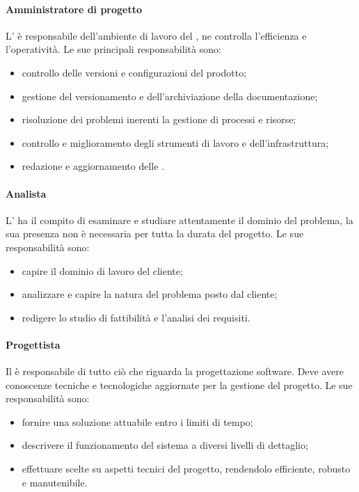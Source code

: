 			\paragraph{Amministratore di progetto}
			L'\amministratore{} è responsabile dell'ambiente di lavoro del , ne controlla l'efficienza e l'operatività.
			Le sue principali responsabilità sono:
			\begin{itemize}
				\item controllo delle versioni e configurazioni del prodotto;
				\item gestione del versionamento e dell'archiviazione della documentazione;
				\item risoluzione dei problemi inerenti la gestione di processi e risorse;
				\item controllo e miglioramento degli strumenti di lavoro e dell'infrastruttura;
				\item redazione e aggiornamento delle \ndp{}.
			\end{itemize}
			\paragraph{Analista}
			L'\analista{} ha il compito di esaminare e studiare attentamente il dominio del problema, la sua presenza non è necessaria per tutta la durata del progetto.
			Le sue responsabilità sono:
			\begin{itemize}
				\item capire il dominio di lavoro del cliente;
				\item analizzare e capire la natura del problema posto dal cliente;
				\item redigere lo studio di fattibilità e l'analisi dei requisiti.
			\end{itemize}
			\paragraph{Progettista}
			Il \progettista{} è responsabile di tutto ciò che riguarda la progettazione software. Deve avere conoscenze tecniche e tecnologiche aggiornate per la gestione del progetto.
			Le sue responsabilità sono:
			\begin{itemize}
				\item fornire una soluzione attuabile entro i limiti di tempo;
				\item descrivere il funzionamento del sistema a diversi livelli di dettaglio;
				\item effettuare scelte su aspetti tecnici del progetto, rendendolo efficiente, robusto e manutenibile.
			\end{itemize}
